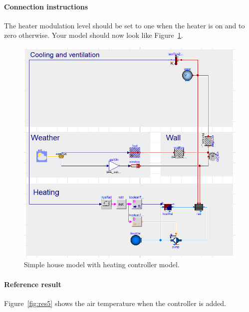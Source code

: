 \documentclass[10pt,a4paper]{article}
\begin{document}
\paragraph{Connection instructions}
The heater modulation level should be set to one when
the heater is on and to zero otherwise. Your model should now
look like Figure~\ref{fig:heatingControllerModel}.

\begin{figure}[h!]
\centering
\includegraphics[scale=0.4]{heatingControllerModel.png}
\caption{Simple house model with heating controller model.}
\label{fig:heatingControllerModel}
\end{figure} 


\paragraph{Reference result}
Figure~\ref{fig:res5} shows the air temperature when
the controller is added.
\end{document}
